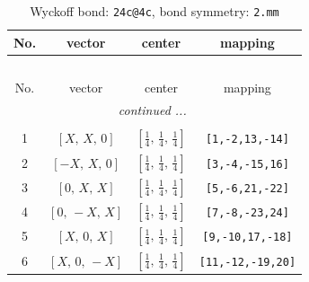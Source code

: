 \documentclass[fleqn,8pt]{jsarticle}
\begin{document}
\begin{longtable}{cccc}
\caption{Wyckoff bond: {\tt 24c@4c}, bond symmetry: {\tt 2.mm}}
 \\
 \hline \hline
No. & vector & center & mapping \\ \hline \endfirsthead

\multicolumn{3}{l}{\tablename\ \thetable{}} \\
 \hline \hline
No. & vector & center & mapping \\ \hline \endhead

 \hline \hline
\multicolumn{3}{r}{\footnotesize\it continued ...} \\ \endfoot

 \hline \hline
\multicolumn{3}{r}{} \\ \endlastfoot

1 & $\left[ X,\, X,\, 0 \right]$ & $\left[ \frac{1}{4},\, \frac{1}{4},\, \frac{1}{4} \right]$ & {\tt [1,-2,13,-14]} \\ \hline
2 & $\left[ - X,\, X,\, 0 \right]$ & $\left[ \frac{1}{4},\, \frac{1}{4},\, \frac{1}{4} \right]$ & {\tt [3,-4,-15,16]} \\ \hline
3 & $\left[ 0,\, X,\, X \right]$ & $\left[ \frac{1}{4},\, \frac{1}{4},\, \frac{1}{4} \right]$ & {\tt [5,-6,21,-22]} \\ \hline
4 & $\left[ 0,\, - X,\, X \right]$ & $\left[ \frac{1}{4},\, \frac{1}{4},\, \frac{1}{4} \right]$ & {\tt [7,-8,-23,24]} \\ \hline
5 & $\left[ X,\, 0,\, X \right]$ & $\left[ \frac{1}{4},\, \frac{1}{4},\, \frac{1}{4} \right]$ & {\tt [9,-10,17,-18]} \\ \hline
6 & $\left[ X,\, 0,\, - X \right]$ & $\left[ \frac{1}{4},\, \frac{1}{4},\, \frac{1}{4} \right]$ & {\tt [11,-12,-19,20]} \\
\end{longtable}
\renewcommand{\arraystretch}{1.2}
\end{document}
